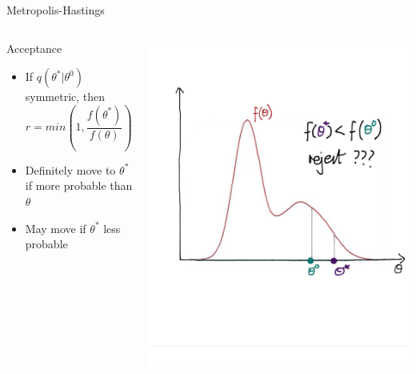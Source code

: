 \documentclass[compress]{beamer}
\begin{document}
\begin{frame}[label=sec-7-7]{Metropolis-Hastings}
\begin{columns}[c] 
\begin{block}{Acceptance}
\begin{itemize}
\item If $q(\theta^*|\theta^{0})$ symmetric, then 
$$ r = min(1,\dfrac{f(\theta^*)}{f(\theta)})$$
\item Definitely move to $\theta^*$ if more probable than $\theta$ 
\item May move if $\theta^*$ less probable 
\end{itemize}
\end{block}

\includegraphics[width=0.8\linewidth]{MH4}
\end{columns}
\end{frame}
\end{document}
